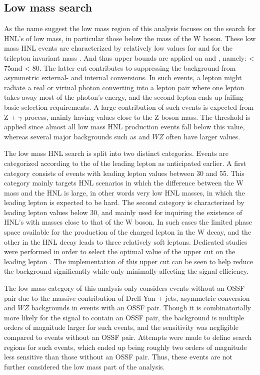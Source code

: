 \subsection{Low mass search}

As the name suggest the low mass region of this analysis focuses on
the search for HNL's of low mass, in particular those below the mass
of the W boson. These low mass HNL events are characterized by
relatively low values for \met  and for the trilepton invariant mass
\mlll. And thus upper bounds are applied on \met  and \mlll , namely:
\met < 75\GeV and \mlll < 80\GeV. The latter cut contributes to 
suppressing the background from asymmetric external- and
internal conversions. In such events, a lepton might radiate a real or
virtual photon converting into a lepton pair where one lepton takes
away most of the photon's energy, and the second lepton ends up
failing basic selection requirements. A large contribution of such
events is expected from Z + $\gamma$ process, mainly having \mlll
values close to the Z boson mass.
The \met threshold is applied since almost all low mass HNL production
events fall below this value, whereas several major backgrounds such
as \ttbar and $WZ$ often have larger \met  values.

The low mass HNL search is split into two distinct categories. Events
are categorized according to the \pt of the leading lepton as
anticipated earlier. A first category consists of events with leading
lepton \pt values between 30 and 55\GeV. This category mainly targets
HNL scenarios in which the difference between the W mass and the HNL
is large, in other words very low HNL masses, in which the leading
lepton is expected to be hard. The second category is characterized by
leading lepton \pt values below 30\GeV, and mainly used for inquiring
the existence of HNL's with masses close to that of the W boson. In
such cases the limited phase space available for the production of the
charged lepton in the W decay, and the other in the HNL decay leads to
three relatively soft leptons.
Dedicated studies were performed in order to select the optimal value
of the upper \pt cut on the leading lepton \pt.
The implementation of this upper \pt cut can be seen to help reduce the background significantly while only minimally affecting the signal efficiency.

The low mass category of this analysis only considers events without
an OSSF pair due to the massive contribution of Drell-Yan + jets, asymmetric
conversion and $WZ$ backgrounds in events with an OSSF pair.
Though it is combinatorially more likely for the signal to contain an
OSSF pair, the background is multiple orders of magnitude larger for
such events,
and the sensitivity was negligible compared to events without an OSSF
pair.
Attempts were made to define search regions for such events, which
ended up being roughly two orders of magnitude less sensitive than
those without an OSSF pair. Thus, these events are not further considered the low mass part of
 the analysis.

